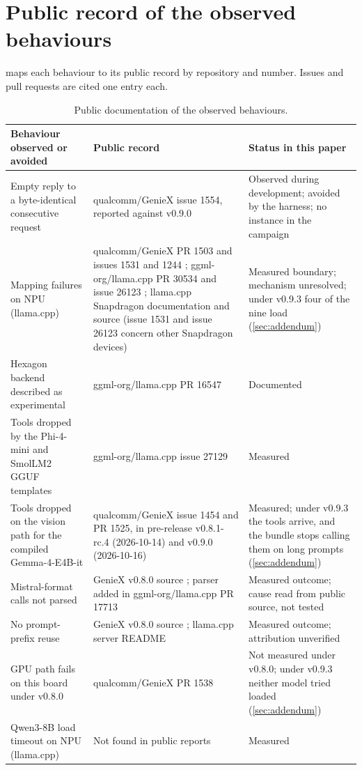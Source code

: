\documentclass[11pt]{article}
\begin{document}
\section{Public record of the observed behaviours}\label{app:public}

 maps each behaviour to its public record by repository and number. Issues and pull requests are cited one entry each.

\begin{table}[tbp]
\centering
\caption{Public documentation of the observed behaviours.}
\label{tab:public}
\footnotesize
\begin{tabularx}{\linewidth}{@{}LLL@{}}
\toprule
Behaviour observed or avoided & Public record & Status in this paper \\
\midrule
Empty reply to a byte-identical consecutive request & qualcomm/GenieX issue 1554, reported against v0.9.0 \citep{geniexIssue1554} & Observed during development; avoided by the harness; no instance in the campaign \\
Mapping failures on NPU (llama.cpp) & qualcomm/GenieX PR 1503 and issues 1531 and 1244 \citep{geniexPR1503,geniexIssue1531,geniexIssue1244}; ggml-org/llama.cpp PR 30534 and issue 26123 \citep{llamacppPR30534,llamacppIssue26123}; llama.cpp Snapdragon documentation and source \citep{llamacpp} (issue 1531 and issue 26123 concern other Snapdragon devices) & Measured boundary; mechanism unresolved; under v0.9.3 four of the nine load (\cref{sec:addendum}) \\
Hexagon backend described as experimental & ggml-org/llama.cpp PR 16547 \citep{llamacppPR16547} & Documented \\
Tools dropped by the Phi-4-mini and SmolLM2 GGUF templates & ggml-org/llama.cpp issue 27129 \citep{llamacppIssue27129} & Measured \\
Tools dropped on the vision path for the compiled Gemma-4-E4B-it & qualcomm/GenieX issue 1454 and PR 1525, in pre-release v0.8.1-rc.4 (2026-10-14) and v0.9.0 (2026-10-16) \citep{geniexIssue1454,geniexPR1525,geniex2026} & Measured; under v0.9.3 the tools arrive, and the bundle stops calling them on long prompts (\cref{sec:addendum}) \\
Mistral-format calls not parsed & GenieX v0.8.0 source \citep{geniexSource}; parser added in ggml-org/llama.cpp PR 17713 \citep{llamacppPR17713} & Measured outcome; cause read from public source, not tested \\
No prompt-prefix reuse & GenieX v0.8.0 source \citep{geniexSource}; llama.cpp server README \citep{llamacppServer} & Measured outcome; attribution unverified \\
GPU path fails on this board under v0.8.0 & qualcomm/GenieX PR 1538 \citep{geniexPR1538} & Not measured under v0.8.0; under v0.9.3 neither model tried loaded (\cref{sec:addendum}) \\
Qwen3-8B load timeout on NPU (llama.cpp) & Not found in public reports & Measured \\
\bottomrule
\end{tabularx}
\end{table}
\end{document}
